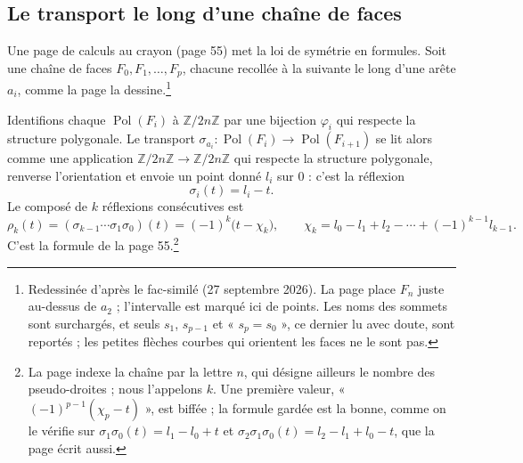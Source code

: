 \documentclass[11pt,a4paper]{article}
\begin{document}
\subsection*{Le transport le long d'une chaîne de faces}

Une page de calculs au crayon (page 55) met la loi de symétrie en formules.
Soit une chaîne de faces $F_0, F_1, \ldots, F_p$, chacune recollée à la suivante
le long d'une arête $a_i$, comme la page la dessine.\footnote{Redessinée d'après
le fac-similé (27 septembre 2026). La page place $F_n$ juste au-dessus de $a_2$ ;
l'intervalle est marqué ici de points. Les noms des sommets sont surchargés, et
seuls $s_1$, $s_{p-1}$ et « $s_p = s_0$ », ce dernier lu avec doute, sont
reportés ; les petites flèches courbes qui orientent les faces ne le sont pas.}

 Identifions chaque $\operatorname{Pol}(F_i)$ à
$\mathbb{Z}/2n\mathbb{Z}$ par une bijection $\varphi_i$ qui respecte la
structure polygonale. Le transport $\sigma_{a_i} : \operatorname{Pol}(F_i) \to
\operatorname{Pol}(F_{i+1})$ se lit alors comme une application
$\mathbb{Z}/2n\mathbb{Z} \to \mathbb{Z}/2n\mathbb{Z}$ qui respecte la structure
polygonale, renverse l'orientation et envoie un point donné $l_i$ sur $0$ :
c'est la réflexion
\[
\sigma_i(t) = l_i - t .
\]
Le composé de $k$ réflexions consécutives est
\[
\rho_k(t) = (\sigma_{k-1} \cdots \sigma_1 \sigma_0)(t) = (-1)^{k}\bigl(t -
\chi_k\bigr), \qquad \chi_k = l_0 - l_1 + l_2 - \cdots + (-1)^{k-1} l_{k-1} .
\]
C'est la formule de la page 55.\footnote{La page indexe la chaîne par la lettre $n$, qui désigne ailleurs le
nombre des pseudo-droites ; nous l'appelons $k$. Une première valeur,
« $(-1)^{p-1}(\chi_p - t)$ », est biffée ; la formule gardée est la bonne,
comme on le vérifie sur $\sigma_1\sigma_0(t) = l_1 - l_0 + t$ et
$\sigma_2\sigma_1\sigma_0(t) = l_2 - l_1 + l_0 - t$, que la page écrit aussi.}
\end{document}
